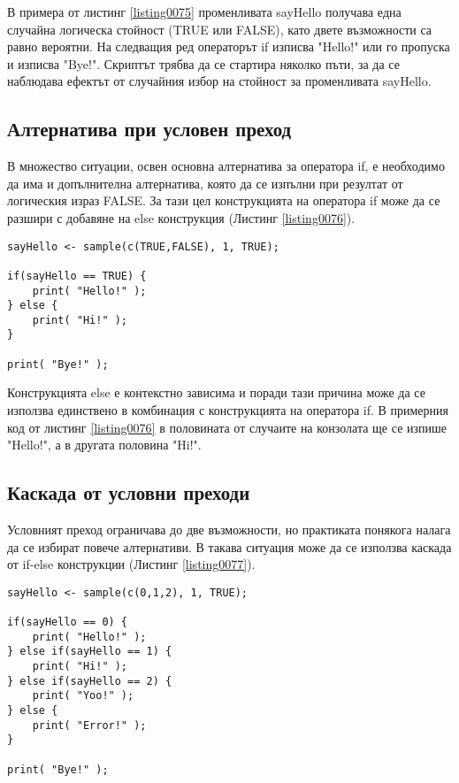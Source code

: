 В примера от листинг \ref{listing0075} променливата sayHello получава една случайна логическа стойност (TRUE или FALSE), като двете възможности са равно вероятни. На следващия ред операторът if изписва "Hello!" или го пропуска и изписва "Bye!". Скриптът трябва да се стартира няколко пъти, за да се наблюдава ефектът от случайния избор на стойност за променливата sayHello.

\subsection{Алтернатива при условен преход}

В множество ситуации, освен основна алтернатива за оператора if, е необходимо да има и допълнителна алтернатива, която да се изпълни при резултат от логическия израз FALSE. За тази цел конструкцията на оператора if може да се разшири с добавяне на else конструкция (Листинг \ref{listing0076}).

\begin{lstlisting}[caption=Оператор за условен преход if-else, label=listing0076]
sayHello <- sample(c(TRUE,FALSE), 1, TRUE);

if(sayHello == TRUE) {
	print( "Hello!" );
} else {
	print( "Hi!" );
}

print( "Bye!" );
\end{lstlisting}
Конструкцията else е контекстно зависима и поради тази причина може да се използва единствено в комбинация с конструкцията на оператора if. В примерния код от листинг \ref{listing0076} в половината от случаите на конзолата ще се изпише "Hello!", а в другата половина "Hi!".

\subsection{Каскада от условни преходи}

Условният преход ограничава до две възможности, но практиката понякога налага да се избират повече алтернативи. В такава ситуация може да се използва каскада от if-else конструкции (Листинг \ref{listing0077}).

\begin{lstlisting}[caption=Каскада от if-else, label=listing0077]
sayHello <- sample(c(0,1,2), 1, TRUE);

if(sayHello == 0) {
	print( "Hello!" );
} else if(sayHello == 1) {
	print( "Hi!" );
} else if(sayHello == 2) {
	print( "Yoo!" );
} else {
	print( "Error!" );
}

print( "Bye!" );
\end{lstlisting}

